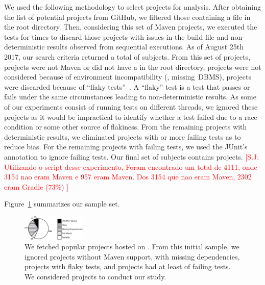 \documentclass[10pt,journal,compsoc]{IEEEtran}
\begin{document}
We used the following methodology to select projects for analysis. After obtaining the list of potential projects from GitHub, we
filtered those
containing a \pomf{} file in the root directory.
Then, considering this set of Maven projects, we
executed the tests for \SubjectsReruns{} times to discard those projects with
issues
in the build file and non-deterministic results observed from sequential
executions.
As of August 25th 2017, our search criteria returned a total of
\SubjectsGithub{}
subjects.
From this set of projects,
\SubjectsGithubNotMaven{} projects were not Maven or did not have a
\pomf{} in the root directory, 
\SubjectsGithubNotTestable{} projects were not considered because of
environment incompatibility
(\eg, missing~DBMS),
\SubjectsGithubFlaky{} projects were discarded because of
``flaky tests''~\cite{luo-etal-fse2014}. A ``flaky'' test is a test that passes
or fails under
the same circumstances leading to non-deterministic results.
As some of our experiments consist of running tests on different
threads, we ignored these projects as it would be impractical
to identify whether a test failed due to a race condition or some
other source of flakiness.
From the remaining \SubjectsGithubConsistant{} projects with
deterministic results, we eliminated \SubjectsGithubTooManyFailures{}
projects with \SuiteFailingThreshold{} or more failing tests as to
reduce bias. For the
remaining projects with failing tests, we used the JUnit's
 annotation to ignore failing tests.
Our final set of subjects contains \numSubjs{} projects. 
 \textcolor{red}{[S.J: Utilizando o script desse experimento, Foram encontrado um total de 4111, onde 3154 nao eram Maven e 957 eram Maven. Dos 3154 que nao eram Maven, 2302 eram Gradle (73\%) ]}
 
 Figure~\ref{fig:subjects} summarizes our sample set.

\begin{figure}[ht]
  \vspace{-5mm}
  \centering
  \includegraphics[width=0.27\textwidth]{results/piechart-subjs.pdf}
  \caption{\label{fig:subjects}We fetched \SubjectsGithub{} popular projects
  hosted on \github{}. From this initial sample, we ignored
  \SubjectsGithubNotMaven{} projects without Maven support,
  \SubjectsGithubNotTestable{} with missing dependencies,
  \SubjectsGithubFlaky{} projects with flaky tests, and
  \SubjectsGithubTooManyFailures{} projects had at least
  \SuiteFailingThreshold{} of failing tests. We considered
  \numSubjs{} projects to conduct our study.}
\end{figure}
\end{document}
